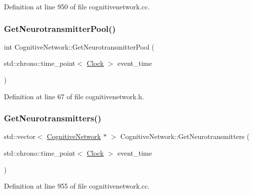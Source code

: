 Definition at line 950 of file cognitivenetwork.\+cc.

\mbox{\label{class_cognitive_network_a4e5b1d60cda4ddb4bd04d8dca42b7a5b}} 
\subsubsection{\texorpdfstring{Get\+Neurotransmitter\+Pool()}{GetNeurotransmitterPool()}}
{\footnotesize\ttfamily int Cognitive\+Network\+::\+Get\+Neurotransmitter\+Pool (\begin{DoxyParamCaption}\item[{std\+::chrono\+::time\+\_\+point$<$ \mbox{\hyperlink{universe_8h_a0ef8d951d1ca5ab3cfaf7ab4c7a6fd80}{Clock}} $>$}]{event\+\_\+time }\end{DoxyParamCaption})\hspace{0.3cm}{\ttfamily [inline]}}



Definition at line 67 of file cognitivenetwork.\+h.

\mbox{\label{class_cognitive_network_ac56b1585864b372c8897dcb5720d00a7}} 
\subsubsection{\texorpdfstring{Get\+Neurotransmitters()}{GetNeurotransmitters()}}
{\footnotesize\ttfamily std\+::vector$<$ \mbox{\hyperlink{class_cognitive_network}{Cognitive\+Network}} $\ast$ $>$ Cognitive\+Network\+::\+Get\+Neurotransmitters (\begin{DoxyParamCaption}\item[{std\+::chrono\+::time\+\_\+point$<$ \mbox{\hyperlink{universe_8h_a0ef8d951d1ca5ab3cfaf7ab4c7a6fd80}{Clock}} $>$}]{event\+\_\+time }\end{DoxyParamCaption})}



Definition at line 955 of file cognitivenetwork.\+cc.

\mbox{\label{class_cognitive_network_a1c92a8f6c42788cf8ca890f062f853a3}} 
